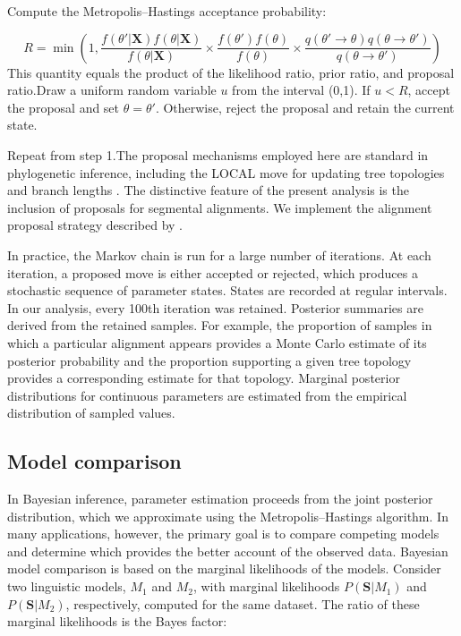 \documentclass[numsec,webpdf,modern,large,namedate]{oup-authoring-template}
\begin{document}
Compute the Metropolis--Hastings acceptance probability:

$$
R= \min (1, \frac{f(\textit{$\theta$}' \vert \mathbf{X})f(\textit{$\theta$}\vert \mathbf{X})}{f(\textit{$\theta$}\vert \mathbf{X})}\times \frac{f(\textit{$\theta$}' )f(\textit{$\theta$})}{f(\textit{$\theta$})}\times \frac{q(\textit{$\theta$}' \rightarrow \textit{$\theta$})q(\textit{$\theta$}\rightarrow \textit{$\theta$}' )}{q(\textit{$\theta$}\rightarrow \textit{$\theta$}' )})
$$This quantity equals the product of the likelihood ratio, prior ratio, and proposal ratio.Draw a uniform random variable $u$ from the interval (0,1). If $u< R$, accept the proposal and set $\textit{$\theta$}= \textit{$\theta$}' $. Otherwise, reject the proposal and retain the current state.

Repeat from step 1.The proposal mechanisms employed here are standard in phylogenetic inference, including the LOCAL move for updating tree topologies and branch lengths \citep{Larget1999}. The distinctive feature of the present analysis is the inclusion of proposals for segmental alignments. We implement the alignment proposal strategy described by \citet{Lunter2005b}. 

In practice, the Markov chain is run for a large number of iterations. At each iteration, a proposed move is either accepted or rejected, which produces a stochastic sequence of parameter states. States are recorded at regular intervals. In our analysis, every 100th iteration was retained. Posterior summaries are derived from the retained samples. For example, the proportion of samples in which a particular alignment appears provides a Monte Carlo estimate of its posterior probability and the proportion supporting a given tree topology provides a corresponding estimate for that topology. Marginal posterior distributions for continuous parameters are estimated from the empirical distribution of sampled values. 

\subsection{Model comparison}
\label{PaperSections_MCMCComparison}
In Bayesian inference, parameter estimation proceeds from the joint posterior distribution, which we approximate using the Metropolis--Hastings algorithm. In many applications, however, the primary goal is to compare competing models and determine which provides the better account of the observed data. Bayesian model comparison is based on the marginal likelihoods of the models. Consider two linguistic models, $\textit{M}_1$ and $\textit{M}_2$, with marginal likelihoods $\textit{P}(\mathbf{S}\vert \textit{M}_1)$ and $\textit{P}(\mathbf{S}\vert \textit{M}_2)$, respectively, computed for the same dataset. The ratio of these marginal likelihoods is the Bayes factor:
\end{document}
